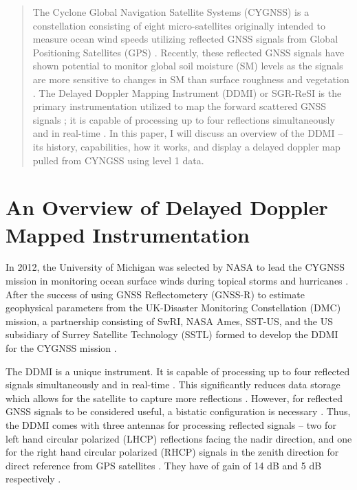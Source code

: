 \documentclass[12pt]{article}
\begin{document}

\begin{abstract}
    \normalsize
    \vspace{1em}
    
    The Cyclone Global Navigation Satellite Systems (CYGNSS) is a constellation consisting of eight micro-satellites originally intended to measure ocean wind speeds utilizing reflected GNSS signals from Global Positioning Satellites (GPS) \cite{NASA}. Recently, these reflected GNSS signals have shown potential to monitor global soil moisture (SM) levels as the signals are more sensitive to changes in SM than surface roughness and vegetation \cite{Global_SM}. The Delayed Doppler Mapping Instrument (DDMI) or SGR-ReSI is the primary instrumentation utilized to map the forward scattered GNSS signals \cite{DDMI_Overview}; it is capable of processing up to four reflections simultaneously and in real-time \cite{DDMI_Overview, DDMI_Summary}. In this paper, I will discuss an overview of the DDMI -- its history, capabilities, how it works, and display a delayed doppler map pulled from CYNGSS using level 1 data. 

\end{abstract}

\section{An Overview of Delayed Doppler Mapped Instrumentation}

In 2012, the University of Michigan was selected by NASA to lead the CYGNSS mission in monitoring ocean surface winds during topical storms and hurricanes \cite{SGR-ReSi_Application}. After the success of using GNSS Reflectometery (GNSS-R) to estimate geophysical parameters from the UK-Disaster Monitoring Constellation (DMC) mission, a partnership consisting of SwRI, NASA Ames, SST-US, and the US subsidiary of Surrey Satellite Technology (SSTL) formed to develop the DDMI for the CYGNSS mission \cite{SGR-ReSi_Application}. 

The DDMI is a unique instrument. It is capable of processing up to four reflected signals simultaneously and in real-time \cite{SGR-ReSi_Application}. This significantly reduces data storage which allows for the satellite to capture more reflections \cite{SGR-ReSi_Application}. However, for reflected GNSS signals to be considered useful, a bistatic configuration is necessary \cite{DDMI_Overview}. Thus, the DDMI comes with three antennas for processing reflected signals -- two for left hand circular polarized (LHCP) reflections facing the nadir direction, and one for the right hand circular polarized (RHCP) signals in the zenith direction for direct reference from GPS satellites \cite{DDMI_Overview}. They have of gain of 14 dB and 5 dB respectively \cite{DDMI_Overview}.
\end{document}
